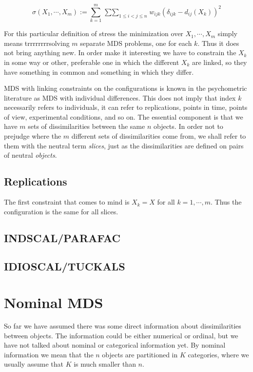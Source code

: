 \documentclass[
  12pt,
]{book}
\theoremstyle{definition}
\theoremstyle{definition}
\theoremstyle{definition}
\theoremstyle{definition}
\theoremstyle{remark}
\begin{document}
\[
\sigma(X_1,\cdots,X_m):=\sum_{k=1}^m\mathop{\sum\sum}_{1\leq i<j\leq n}w_{ijk}(\delta_{ijk}-d_{ij}(X_k))^2
\]

For this particular definition of stress the minimization over \(X_1,\cdots,X_m\) simply means trrrrrrrrsolving \(m\) separate MDS problems, one for each \(k\). Thus it does not bring anything new. In order make it interesting we have to
constrain the \(X_k\) in some way or other, preferable one in which the different \(X_k\) are linked, so they have
something in common and something in which they differ.

MDS with linking constraints on the configurations is known in the psychometric literature as MDS with individual differences. This does not imply that index \(k\) necessarily refers to individuals, it can refer to replications,
points in time, points of view, experimental conditions, and so on. The essential component is that we have
\(m\) sets of dissimilarities between the same \(n\) objects. In order not to prejudge where the \(m\) different sets of dissimilarities come from, we shall refer to them with the neutral term \emph{slices}, just as the dissimilarities are defined on pairs of neutral \emph{objects}.

\hypertarget{indifrepl}{%
\section{Replications}\label{indifrepl}}

The first constraint that comes to mind is \(X_k=X\) for all \(k=1,\cdots,m\). Thus the configuration is the same for all slices.

\hypertarget{indifindscal}{%
\section{INDSCAL/PARAFAC}\label{indifindscal}}

\hypertarget{indifidioscal}{%
\section{IDIOSCAL/TUCKALS}\label{indifidioscal}}

\hypertarget{chnominal}{%
\chapter{Nominal MDS}\label{chnominal}}

So far we have assumed there was some direct information about dissimilarities
between objects. The information could be either numerical or ordinal, but we have not talked about nominal or categorical information yet. By nominal information we mean that the \(n\) objects are partitioned in \(K\) categories, where we usually assume that \(K\) is much smaller than \(n\).
\end{document}
